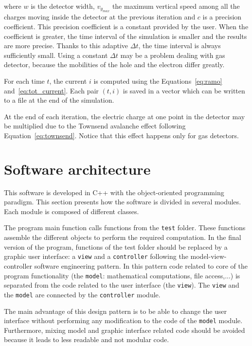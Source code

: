 \documentclass[11pt]{article}
\begin{document}
where $w$ is the detector width, $v_{y_{max}}$ the maximum vertical speed
among all the charges moving inside the detector at the previous iteration and
$c$ is a precision coefficient. This precision coefficient is a constant provided
by the user. When the coefficient is greater, the time interval
of the simulation is smaller and the results are more precise.
Thanks to this adaptive $\Delta t$, the time interval is always sufficiently small.
Using a constant $\Delta t$ may be a problem dealing with gas detector, because
the mobilities of the hole and the electron differ greatly.

For each time $t$, the current $i$ is computed using the Equations~\ref{eq:ramo}
and~\ref{eq:tot_current}. Each pair $(t, i)$ is saved in a vector which can be
written to a file at the end of the simulation.

At the end of each iteration, the electric charge at one point in the detector
may be multiplied due to the Townsend avalanche effect following Equation~\ref{eq:townsend}.
Notice that this effect happens only for gas detectors.

\section{Software architecture}

	This software is developed in C++ with the object-oriented programming paradigm.
	This section presents how the software is divided in several modules. Each module
	is composed of different classes.

	The program main function calls functions from the \texttt{test} folder. These functions
	assemble the different objects to perform the required computation. In the
	final version of the program, functions of the test folder should be replaced
	by a graphic user interface: a \texttt{view} and a \texttt{controller} following
	the model-view-controller software engineering pattern. In this pattern code
	related to core of the program functionality (the \texttt{model}: mathematical computations, file access,...)
	is separated from the code related to the user interface (the \texttt{view}).
	The \texttt{view} and the
	\texttt{model} are connected by the \texttt{controller} module.

	The main advantage of this design pattern is to be able to change the user interface without
	performing any modification to the code of the \texttt{model} module. Furthermore,
	mixing model and graphic interface related code should be avoided because it leads to
	less readable and not modular code.
\end{document}
